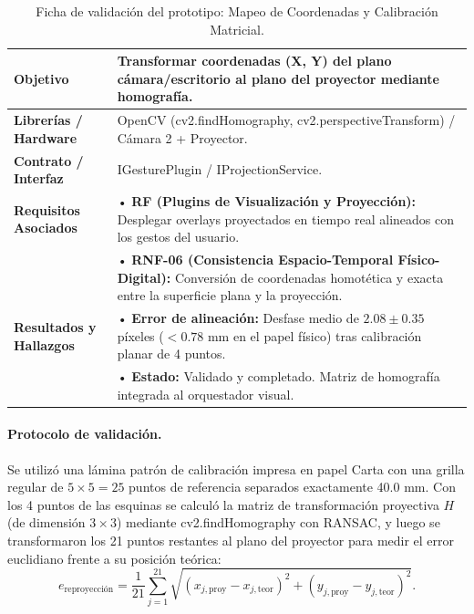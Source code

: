 \begin{table}[H]
    \centering
    \caption{Ficha de validación del prototipo: Mapeo de Coordenadas y Calibración Matricial.}
    \label{tab:ficha_f7}
    \begin{tabular}{|L{3.2cm}|L{11.0cm}|}
        \hline
        \textbf{Objetivo} & Transformar coordenadas (X, Y) del plano cámara/escritorio al plano del proyector mediante homografía. \\ \hline
        \textbf{Librerías / Hardware} & OpenCV (cv2.findHomography, cv2.perspectiveTransform) / Cámara 2 + Proyector. \\ \hline
        \textbf{Contrato / Interfaz} & IGesturePlugin / IProjectionService. \\ \hline
        \textbf{Requisitos Asociados} &
        • \textbf{RF (Plugins de Visualización y Proyección):} Desplegar overlays proyectados en tiempo real alineados con los gestos del usuario. \vspace{0.1cm} \\
        & • \textbf{RNF-06 (Consistencia Espacio-Temporal Físico-Digital):} Conversión de coordenadas homotética y exacta entre la superficie plana y la proyección. \\ \hline
        \textbf{Resultados y Hallazgos} &
        • \textbf{Error de alineación:} Desfase medio de $2.08 \pm 0.35$ píxeles ($<0.78$ mm en el papel físico) tras calibración planar de 4 puntos. \vspace{0.1cm} \\
        & • \textbf{Estado:} Validado y completado. Matriz de homografía integrada al orquestador visual. \\ \hline
    \end{tabular}
\end{table}
 
\paragraph{Protocolo de validación.} Se utilizó una lámina patrón de calibración impresa en papel Carta con una grilla regular de $5 \times 5 = 25$ puntos de referencia separados exactamente 40.0 mm. Con los 4 puntos de las esquinas se calculó la matriz de transformación proyectiva $H$ (de dimensión $3 \times 3$) mediante cv2.findHomography con RANSAC, y luego se transformaron los 21 puntos restantes al plano del proyector para medir el error euclidiano frente a su posición teórica:
\[ e_{\mathrm{reproyección}} = \frac{1}{21} \sum_{j=1}^{21} \sqrt{(x_{j,\mathrm{proy}} - x_{j,\mathrm{teor}})^2 + (y_{j,\mathrm{proy}} - y_{j,\mathrm{teor}})^2}. \]
 
